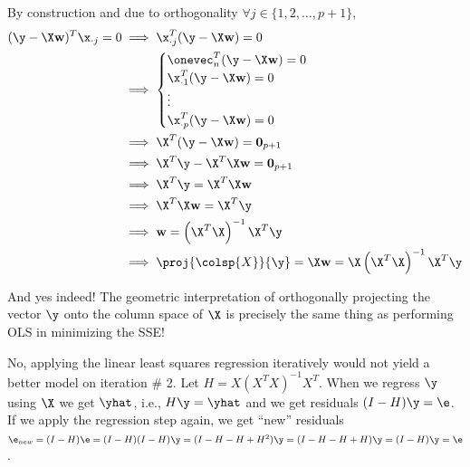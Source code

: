 \documentclass[12pt]{article}
\begin{document}
\begin{enumerate}
\begin{tcolorbox}[colback = white, sharp corners]
By construction and due to orthogonality $\forall j \in \lbrace 1, 2, \ldots, p+1 \rbrace $, 
\begin{align*}
(\y - \X \mathbf{w})^T \x_{\cdot j} = 0 &\implies \x_{\cdot j}^T(\y - \X \mathbf{w}) = 0 \\
&\implies \begin{cases}
\onevec_n^T(\y - \X \mathbf{w}) = 0 \\
\x_{\cdot 1}^T(\y - \X \mathbf{w}) = 0\\
\vdots \\
\x_{\cdot p}^T(\y - \X \mathbf{w}) = 0
\end{cases} \\
&\implies \X^T(\y - \X \mathbf{w}) = \mathbf{0}_{p+1} \\
&\implies \X^T \y - \X^T \X \mathbf{w} = \mathbf{0}_{p+1} \\
&\implies \X^T \y = \X^T \X \mathbf{w} \\
&\implies \X^T \X \mathbf{w} = \X^T \y \\ 
&\implies \mathbf{w} = \left(\X^T \X \right)^{-1} \X^T \y \\
&\implies \proj{\colsp{X}}{\y} = \X \mathbf{w} = \X \left(\X^T \X \right)^{-1} \X^T \y
\end{align*}


And yes indeed! The geometric interpretation of orthogonally projecting the vector $\y$ onto the column space of $\X$ is precisely the same thing as performing OLS in minimizing the SSE! 
\end{tcolorbox}

\newpage

\begin{tcolorbox}[colback = white, sharp corners]
No, applying the linear least squares regression iteratively would not yield a better model on iteration \# 2. Let $H = X(X^T X)^{-1}X^T$. When we regress $\y$ using $\X$ we get $\yhat$, i.e., $H \y = \yhat$ and we get residuals $(I - H)\y = \e $. If we apply the regression step again, we get ``new'' residuals $\e_{new} = (I-H)\e = (I-H)(I-H)\y = (I - H -H + H^2) \y = (I - H - H + H)\y = (I-H) \y = \e$. 
\end{tcolorbox}


\end{enumerate}
\end{document}
